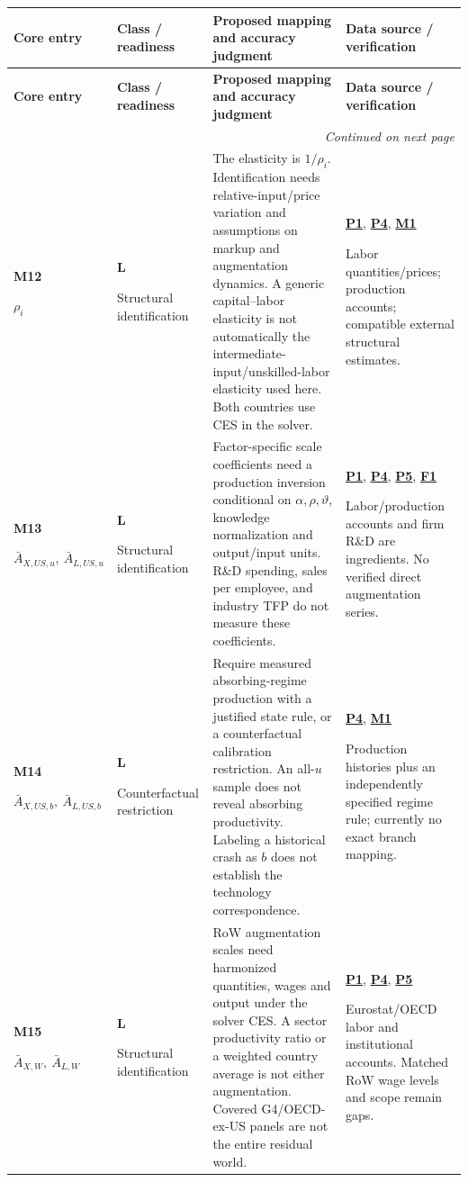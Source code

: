 \documentclass[10pt,a4paper,landscape]{article}
\makeatletter
\newenvironment{measuretable}{%
\fontsize{9.4}{10.8}\selectfont\setlength{\parskip}{1pt}
\begin{longtable}{@{}P{\dimexpr .14\textwidth-4.2pt\relax}P{\dimexpr .135\textwidth-4.05pt\relax}P{\dimexpr .455\textwidth-13.65pt\relax}P{\dimexpr .27\textwidth-8.1pt\relax}@{}}
\toprule\rowcolor{tablehead}\textbf{Core entry} & \textbf{Class / readiness} & \textbf{Proposed mapping and accuracy judgment} & \textbf{Data source / verification}\\\midrule
\endfirsthead
\toprule\rowcolor{tablehead}\textbf{Core entry} & \textbf{Class / readiness} & \textbf{Proposed mapping and accuracy judgment} & \textbf{Data source / verification}\\\midrule
\endhead\midrule\multicolumn{4}{r}{\footnotesize\itshape Continued on next page}\\\endfoot
\bottomrule\endlastfoot
}{\end{longtable}}
\makeatother
\begin{document}
\begin{measuretable}
\textbf{M12}\par $\rho_i$ & \textbf{L}\par Structural identification & The elasticity is $1/\rho_i$. Identification needs relative-input/price variation and assumptions on markup and augmentation dynamics. A generic capital--labor elasticity is not automatically the intermediate-input/unskilled-labor elasticity used here. Both countries use CES in the solver. & \hyperlink{src-P1}{\textbf{P1}}, \hyperlink{src-P4}{\textbf{P4}}, \hyperlink{src-M1}{\textbf{M1}}\par Labor quantities/prices; production accounts; compatible external structural estimates.\\[4pt]
\textbf{M13}\par $\bar A_{X,US,u},\ \bar A_{L,US,u}$ & \textbf{L}\par Structural identification & Factor-specific scale coefficients need a production inversion conditional on $\alpha,\rho,\vartheta$, knowledge normalization and output/input units. R\&D spending, sales per employee, and industry TFP do not measure these coefficients. & \hyperlink{src-P1}{\textbf{P1}}, \hyperlink{src-P4}{\textbf{P4}}, \hyperlink{src-P5}{\textbf{P5}}, \hyperlink{src-F1}{\textbf{F1}}\par Labor/production accounts and firm R\&D are ingredients. No verified direct augmentation series.\\[4pt]
\textbf{M14}\par $\bar A_{X,US,b},\ \bar A_{L,US,b}$ & \textbf{L}\par Counterfactual restriction & Require measured absorbing-regime production with a justified state rule, or a counterfactual calibration restriction. An all-$u$ sample does not reveal absorbing productivity. Labeling a historical crash as $b$ does not establish the technology correspondence. & \hyperlink{src-P4}{\textbf{P4}}, \hyperlink{src-M1}{\textbf{M1}}\par Production histories plus an independently specified regime rule; currently no exact branch mapping.\\[4pt]
\textbf{M15}\par $\bar A_{X,W},\ \bar A_{L,W}$ & \textbf{L}\par Structural identification & RoW augmentation scales need harmonized quantities, wages and output under the solver CES. A sector productivity ratio or a weighted country average is not either augmentation. Covered G4/OECD-ex-US panels are not the entire residual world. & \hyperlink{src-P1}{\textbf{P1}}, \hyperlink{src-P4}{\textbf{P4}}, \hyperlink{src-P5}{\textbf{P5}}\par Eurostat/OECD labor and institutional accounts. Matched RoW wage levels and scope remain gaps.\\[4pt]

\end{measuretable}
\end{document}
